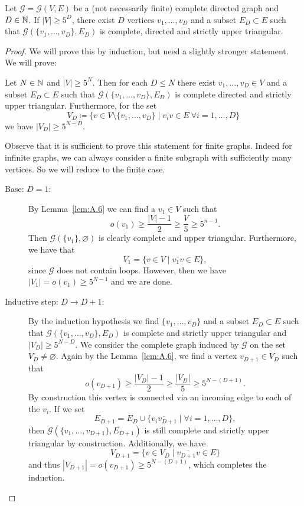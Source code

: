 \begin{lemma}[{\cite[Lemma~A.8]{MR3509968}}]
  \label{lem:A.8}
  Let \(\mathcal{G} = \mathcal{G}(V,E)\) be a (not necessarily finite) complete directed graph and \(D \in \mathbb{N}\). If \(|V| \geq 5^D\), there exist \(D\) vertices \(v_1, \dots, v_D\) and a subset \(E_D \subset E\) such that \(\mathcal{G}(\{v_1, \dots, v_D\}, E_D)\) is complete, directed and strictly upper triangular.
\end{lemma}

\begin{proof}
  We will prove this by induction, but need a slightly stronger statement. We will prove:

  Let \(N \in \mathbb{N}\) and \(|V| \geq 5^N\). Then for each \(D \leq N\) there exist \(v_1,\dots, v_D \in V\) and a subset \(E_D \subset E\) such that \(\mathcal{G}(\{v_1, \dots, v_D\}, E_D)\) is complete directed and strictly upper triangular. Furthermore, for the set
  \[
    V_D \coloneqq \{v \in V \setminus \{v_1, \dots, v_D\} \mid \overline{v_iv} \in E\ \forall i =1,\dots, D\}
  \]
  we have \(|V_D| \geq 5^{N-D}\).

  Observe that it is sufficient to prove this statement for finite graphs. Indeed for infinite graphs, we can always consider a finite subgraph with sufficiently many vertices. So we will reduce to the finite case.
  \begin{description}
  \item[Base: \(D = 1\):] By Lemma~\ref{lem:A.6} we can find a \(v_1 \in V\) such that
    \[
      o(v_1) \geq \frac{|V| - 1}{2} \geq \frac{V}{5} \geq 5^{n-1}.
    \]
    Then \(\mathcal{G}(\{v_1\}, \varnothing)\) is clearly complete and upper triangular. Furthermore, we have that
    \[
      V_1 = \{v \in V \mid \overline{v_1v} \in E\},
    \]
    since \(\mathcal{G}\) does not contain loops. However, then we have \(|V_1| = o(v_1) \geq 5^{N-1}\) and we are done.
  \item[Inductive step: \(D \to D+1\):] By the induction hypothesis we find \(\{v_1, \dots, v_D\}\) and a subset \(E_D \subset E\) such that \(\mathcal{G}(\{v_1, \dots, v_D\}, E_D)\) is complete and strictly upper triangular and \(|V_D| \geq 5^{N-D}\). We consider the complete graph induced by \(\mathcal{G}\) on the set \(V_D \neq \varnothing\). Again by the Lemma~\ref{lem:A.6}, we find a vertex \(v_{D+1} \in V_D\) such that
    \[
      o(v_{D+1}) \geq \frac{|V_D| -1}{2} \geq \frac{|V_D|}{5} \geq 5^{N - (D+1)}.
    \]
    By construction this vertex is connected via an incoming edge to each of the \(v_i\). If we set
    \[
      E_{D+1} = E_D \cup \{\overline{v_iv_{D+1}} \mid \forall i = 1, \dots, D\},
    \]
    then \(\mathcal{G}(\{v_1, \dots, v_{D+1}\}, E_{D+1})\) is still complete and strictly upper triangular by construction. Additionally, we have
    \[
      V_{D+1} = \{v \in V_D \mid \overline{v_{D+1}v} \in E\}
    \]
    and thus \(|V_{D+1}| = o(v_{D+1}) \geq 5^{N- (D+1)}\), which completes the induction.
  \end{description}
\end{proof}

